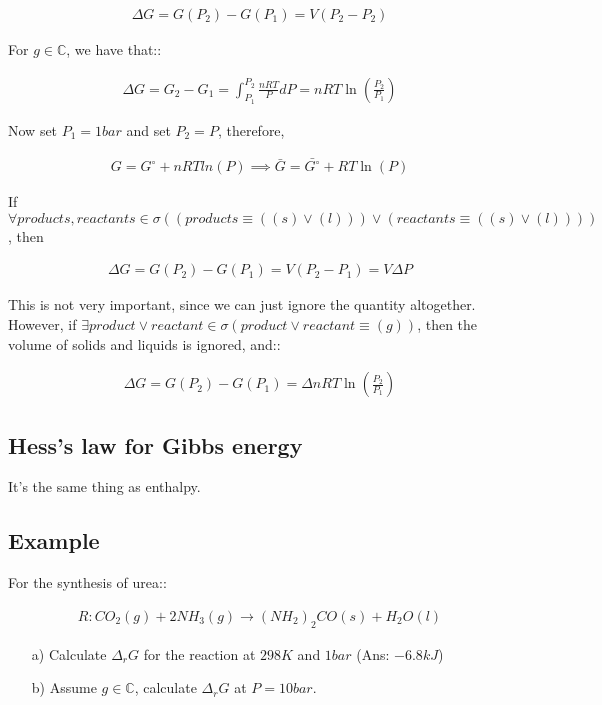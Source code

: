 \documentclass[12pt]{book}
\begin{document}
\begin{align*}
    \Delta G=G(P_2)-G(P_1)=V(P_2-P_2)
\end{align*}

For $g\in \mathbb{C}$, we have that::

\begin{align*}
    \Delta G=G_2-G_1=\int_{P_1}^{P_2}\frac{nRT}{P}dP=nRT\ln\left(\frac{P_2}{P_1}\right)
\end{align*}

Now set $P_1=1bar$ and set $P_2=P$, therefore,

\begin{align*}
    G=G^{\circ}+nRTln(P)\implies \bar{G}=\bar{G^{\circ}}+RT\ln(P)
\end{align*}

If $\forall products,reactants \in \sigma((products\equiv ((s)\lor (l)))\lor (reactants \equiv((s)\lor (l))))$, then

\begin{align*}
    \Delta G=G(P_2)-G(P_1)=V(P_2-P_1)=V\Delta P
\end{align*}

This is not very important, since we can just ignore the quantity altogether.\\

However, if $\exists product\lor reactant\in \sigma(product\lor reactant\equiv (g))$, then the volume of solids and liquids is ignored, and::

\begin{align*}
    \Delta G=G(P_2)-G(P_1)=\Delta nRT\ln\left(\frac{P_2}{P_1}\right)
\end{align*}

\subsection*{Hess's law for Gibbs energy}
It's the same thing as enthalpy.

\subsection*{Example}

For the synthesis of urea::

\begin{align*}
    R:CO_2(g)+2NH_3(g)\rightarrow (NH_2)_2CO(s)+H_2O(l)
\end{align*}

\begin{itemize}
    \item[a)] Calculate $\Delta_r G$ for the reaction at $298K$ and $1 bar$ (Ans: $-6.8 kJ$)
    \item[b)] Assume $g\in \mathbb{C}$, calculate $\Delta_r G$ at $P=10bar$.
\end{itemize}
\end{document}
